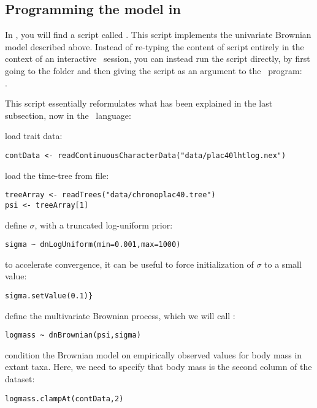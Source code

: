 \subsection{Programming the model in \RevBayes}

In , you will find a script called .
This script implements the univariate Brownian model described above. Instead of re-typing the content of script entirely in the context of an interactive \RevBayes~session, you can instead run the script directly, by first going to the  folder and then giving the script as an argument to the \RevBayes~program:
\\
.

This script essentially reformulates what has been explained in the last subsection, now in the \Rev~language:


load trait data:
{\tt \small \begin{snugshade*}
\begin{lstlisting}
contData <- readContinuousCharacterData("data/plac40lhtlog.nex")
\end{lstlisting}
\end{snugshade*}}

load the time-tree from file:
{\tt \small \begin{snugshade*}
\begin{lstlisting}
treeArray <- readTrees("data/chronoplac40.tree")
psi <- treeArray[1]
\end{lstlisting}
\end{snugshade*}}

define $\sigma$, with a truncated log-uniform prior:
{\tt \small \begin{snugshade*}
\begin{lstlisting}
sigma ~ dnLogUniform(min=0.001,max=1000)
\end{lstlisting}
\end{snugshade*}}
to accelerate convergence, it can be useful to force initialization of $\sigma$ to a small value:
{\tt \small \begin{snugshade*}
\begin{lstlisting}
sigma.setValue(0.1)}
\end{lstlisting}
\end{snugshade*}}

define the multivariate Brownian process, which we will call :
{\tt \small \begin{snugshade*}
\begin{lstlisting}
logmass ~ dnBrownian(psi,sigma)
\end{lstlisting}
\end{snugshade*}}
condition the Brownian model on empirically observed values for body mass in extant taxa.
Here, we need to specify that body mass is the second column of the dataset:
{\tt \small \begin{snugshade*}
\begin{lstlisting}
logmass.clampAt(contData,2)
\end{lstlisting}
\end{snugshade*}}

